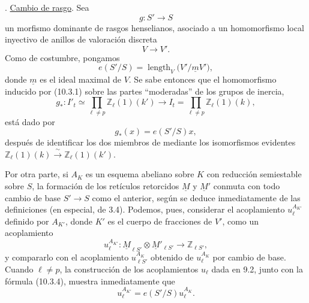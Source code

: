 
\medskip
{}. \underline{Cambio de rasgo}. Sea
\begin{equation}\tag{10.3.1}
g:S'\longrightarrow S
\end{equation}
un morfismo dominante de rasgos henselianos, asociado a un
homomorfismo local inyectivo de anillos de valoración discreta
\begin{equation*}
V\longrightarrow V'.
\end{equation*}
Como de costumbre, pongamos
\begin{equation}\tag{10.3.2}
e(S'/S)=\operatorname{length}_V\bigl(V'/\underline mV'\bigr),
\end{equation}
donde $\underline m$ es el ideal maximal de $V$. Se sabe entonces que
el homomorfismo inducido por (10.3.1) sobre las partes ``moderadas'' de
los grupos de inercia,
\begin{equation}\tag{10.3.3}
g_*:I'_t\simeq\prod_{\ell\ne p}\mathbb Z_\ell(1)(k')
 \longrightarrow
 I_t=\prod_{\ell\ne p}\mathbb Z_\ell(1)(k),
\end{equation}
está dado por
\begin{equation}\tag{10.3.4}
g_*(x)=e(S'/S)x,
\end{equation}
después de identificar los dos miembros de
 mediante los isomorfismos evidentes
$\mathbb Z_\ell(1)(k)\xrightarrow{\ \sim\ }
\mathbb Z_\ell(1)(k')$.

Por otra parte, si $A_K$ es un esquema abeliano sobre $K$ con
reducción semiestable sobre $S$, la formación de los retículos
retorcidos $\underline M$ y $\underline M'$ conmuta con todo cambio de
base $S'\longrightarrow S$ como el anterior, según se deduce
inmediatamente de las definiciones (en especial, de 3.4). Podemos,
pues, considerar el acoplamiento $u_\ell^{A_{K'}}$ definido por
$A_{K'}$, donde $K'$ es el cuerpo de fracciones de $V'$, como un
acoplamiento
\begin{equation*}
u_\ell^{A_{K'}}:
 \underline M_{\ell S'}\otimes\underline M'_{\ell S'}
 \longrightarrow\mathbb Z_{\ell S'},
\end{equation*}
y compararlo con el acoplamiento $u_{\ell S'}^{A_K}$ obtenido de
$u_\ell^{A_K}$ por cambio de base. Cuando $\ell\ne p$, la construcción
de los acoplamientos $u_\ell$ dada en 9.2, junto con la fórmula
(10.3.4), muestra inmediatamente que
\begin{equation}\tag{10.3.5}
u_\ell^{A_{K'}}=e(S'/S)u_\ell^{A_K}.
\end{equation}

